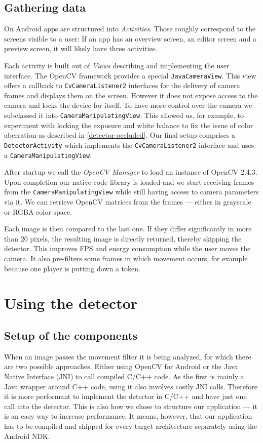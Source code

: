	\subsection{Gathering data}
	\label{android-framework-gathering}
	On Android apps are structured into \textit{Activities}. Those roughly correspond to the screens visible to a user: If an app has an overview screen, an editor screen and a preview screen, it will likely have three activities.

	Each activity is built out of \textit{Views} describing and implementing the user interface. The OpenCV framework provides a special \texttt{JavaCameraView}. This view offers a callback to \texttt{CvCameraListener2} interfaces for the delivery of camera frames and displays them on the screen. However it does not expose access to the camera and locks the device for itself. To have more control over the camera we subclassed it into \texttt{CameraManipulatingView}. This allowed us, for example, to experiment with locking the exposure and white balance to fix the issue of color aberration as described in \autoref{detector-occluded}. Our final setup comprises a \texttt{DetectorActivity} which implements the \texttt{CvCameraListener2} interface and uses a \texttt{CameraManipulatingView}.

	After startup we call the \textit{OpenCV Manager} to load an instance of OpenCV 2.4.3. Upon completion our native code library is loaded and we start receiving frames from the \texttt{CameraManipulatingView} while still having access to camera parameters via it. We can retrieve OpenCV matrices from the frames --- either in grayscale or RGBA color space.

	Each image is then compared to the last one. If they differ significantly in more than 20 pixels, the resulting image is directly returned, thereby skipping the detector. This improves FPS and energy consumption while the user moves the camera. It also pre-filters some frames in which movement occurs, for example because one player is putting down a token.

	\section{Using the detector}
	\label{android-detector}
	\subsection{Setup of the components}
	\label{android-detector-setup}
	When an image passes the movement filter it is being analyzed, for which there are two possible approaches. Either using OpenCV for Android or the Java Native Interface (JNI) to call compiled C/C++ code. As the first is mainly a Java wrapper around C++ code, using it also involves costly JNI calls. Therefore it is more performant to implement the detector in C/C++ and have just one call into the detector. This is also how we chose to structure our application --- it is an easy way to increase performance. It means, however, that our application has to be compiled and shipped for every target architecture separately using the Android NDK.

